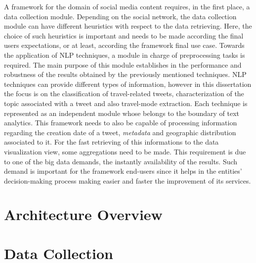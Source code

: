 A framework for the domain of social media content requires, in the first place, a data collection module. Depending on the social network, the data collection module can have different heuristics with respect to the data retrieving. Here, the choice of such heuristics is important and needs to be made according the final users expectations, or at least, according the framework final use case. Towards the application of NLP techniques, a module in charge of preprocessing tasks is required. The main purpose of this module establishes in the performance and robustness of the results obtained by the previously mentioned techniques. NLP techniques can provide different types of information, however in this dissertation the focus is on the classification of travel-related tweets, characterization of the topic associated with a tweet and also travel-mode extraction. Each technique is represented as an independent module whose belongs to the boundary of text analytics. This framework needs to also be capable of processing information regarding the creation date of a tweet, \textit{metadata} and geographic distribution associated to it. For the fast retrieving of this informations to the data visualization view, some aggregations need to be made. This requirement is due to one of the big data demands, the instantly availability of the results. Such demand is important for the framework end-users since it helps in the entities' decision-making process making easier and faster the improvement of its services.

\section{Architecture Overview}\label{sec:architecture}

\section{Data Collection}\label{sec:data_collection}

